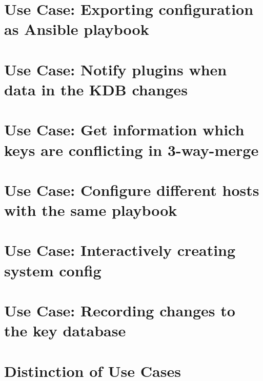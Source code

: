 \let\mypdfximage\pdfximage\def\pdfximage{\immediate\mypdfximage}\documentclass[twoside]{book}
\newcommand{\+}{\discretionary{\mbox{\scriptsize$\hookleftarrow$}}{}{}}
\begin{document}
\chapter{Use Case\+: Exporting configuration as Ansible playbook}
\label{doc_usecases_record_elektra_UC_ansible_export_md}

\chapter{Use Case\+: Notify plugins when data in the KDB changes}
\label{doc_usecases_record_elektra_UC_change_notifications_md}

\chapter{Use Case\+: Get information which keys are conflicting in 3-\/way-\/merge}
\label{doc_usecases_record_elektra_UC_cmerge_conflict_keys_md}

\chapter{Use Case\+: Configure different hosts with the same playbook}
\label{doc_usecases_record_elektra_UC_different_hosts_md}

\chapter{Use Case\+: Interactively creating system config}
\label{doc_usecases_record_elektra_UC_interactive_configuration_md}

\chapter{Use Case\+: Recording changes to the key database}
\label{doc_usecases_record_elektra_UC_record_changes_md}

\chapter{Distinction of Use Cases}
\label{doc_usecases_snippet_sharing_distinction_use_cases_md}

\end{document}
